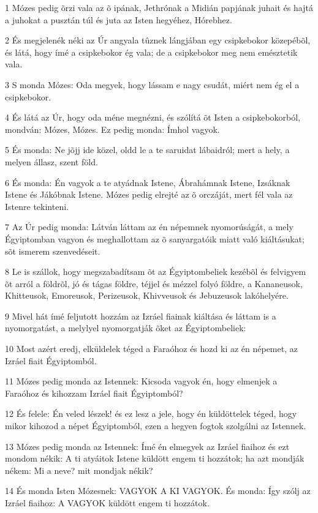 \par 1 Mózes pedig õrzi vala az õ ipának, Jethrónak a Midián papjának juhait és hajtá a juhokat a pusztán túl és juta az Isten hegyéhez, Hórebhez.
\par 2 És megjelenék néki az Úr angyala tûznek lángjában egy csipkebokor közepébõl, és látá, hogy ímé a csipkebokor ég vala; de a csipkebokor meg nem emésztetik vala.
\par 3 S monda Mózes: Oda megyek, hogy lássam e nagy csudát, miért nem ég el a csipkebokor.
\par 4 És látá az Úr, hogy oda méne megnézni, és szólítá õt Isten a csipkebokorból, mondván: Mózes, Mózes. Ez pedig monda: Ímhol vagyok.
\par 5 És monda: Ne jõjj ide közel, oldd le a te saruidat lábaidról; mert a hely, a melyen állasz, szent föld.
\par 6 És monda: Én vagyok a te atyádnak Istene, Ábrahámnak Istene, Izsáknak Istene és Jákóbnak Istene. Mózes pedig elrejté az õ orczáját, mert fél vala az Istenre tekinteni.
\par 7 Az Úr pedig monda: Látván láttam az én népemnek nyomorúságát, a mely Égyiptomban vagyon és meghallottam az õ sanyargatóik miatt való kiáltásukat; sõt ismerem szenvedéseit.
\par 8 Le is szállok, hogy megszabadítsam õt az Égyiptombeliek kezébõl és felvigyem õt arról a földrõl, jó és tágas földre, téjjel és mézzel folyó földre, a Kananeusok, Khitteusok, Emoreusok, Perizeusok, Khivveusok és Jebuzeusok lakóhelyére.
\par 9 Mivel hát ímé feljutott hozzám az Izráel fiainak kiáltása és láttam is a nyomorgatást, a melylyel nyomorgatják õket az Égyiptombeliek:
\par 10 Most azért eredj, elküldelek téged a Faraóhoz és hozd ki az én népemet, az Izráel fiait Égyiptomból.
\par 11 Mózes pedig monda az Istennek: Kicsoda vagyok én, hogy elmenjek a Faraóhoz és kihozzam Izráel fiait Égyiptomból?
\par 12 És felele: Én veled lészek! és ez lesz a jele, hogy én küldöttelek téged, hogy mikor kihozod a népet Égyiptomból, ezen a hegyen fogtok szolgálni az Istennek.
\par 13 Mózes pedig monda az Istennek: Ímé én elmegyek az Izráel fiaihoz és ezt mondom nékik: A ti atyáitok Istene küldött engem ti hozzátok; ha azt mondják nékem: Mi a neve? mit mondjak nékik?
\par 14 És monda Isten Mózesnek: VAGYOK A KI VAGYOK. És monda: Így szólj az Izráel fiaihoz: A VAGYOK küldött engem ti hozzátok.
